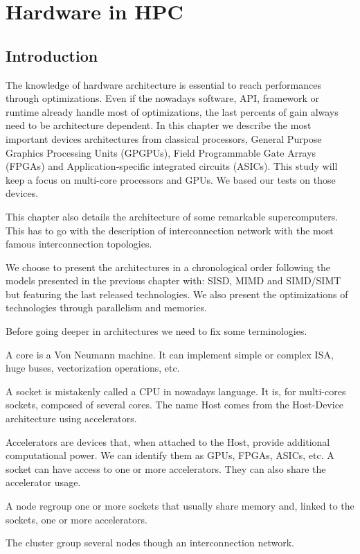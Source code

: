 
\chapter{Hardware in HPC}

\section{Introduction}

The knowledge of hardware architecture is essential to reach performances through optimizations.
Even if the nowadays software, API, framework or runtime already handle most of optimizations, the last percents of gain always need to be architecture dependent. 
In this chapter we describe the most important devices architectures from classical processors, General Purpose Graphics Processing Units (GPGPUs), Field Programmable Gate Arrays (FPGAs) and Application-specific integrated circuits (ASICs).
This study will keep a focus on multi-core processors and GPUs. 
We based our tests on those devices. 

This chapter also details the architecture of some remarkable supercomputers. 
This has to go with the description of interconnection network with the most famous interconnection topologies. 

We choose to present the architectures in a chronological order following the models presented in the previous chapter with: SISD, MIMD and SIMD/SIMT but featuring the last released technologies.
We also present the optimizations of technologies through parallelism and memories.

Before going deeper in architectures we need to fix some terminologies. 
\begin{description}
\item[Core:] A core is a Von Neumann machine. It can implement simple or complex ISA, huge buses, vectorization operations, etc.
\item[Socket/Host:] A socket is mistakenly called a CPU in nowadays language. It is, for multi-cores sockets, composed of several cores. The name Host comes from the Host-Device architecture using accelerators. 
\item[Accelerators/Devices:] Accelerators are devices that, when attached to the Host, provide additional computational power. 
We can identify them as GPUs, FPGAs, ASICs, etc. 
A socket can have access to one or more accelerators.
They can also share the accelerator usage. 
\item[Node:] A node regroup one or more sockets that usually share memory and, linked to the sockets, one or more accelerators. 
\item[Cluster/Supercomputer] The cluster group several nodes though an interconnection network.
\end{description}

